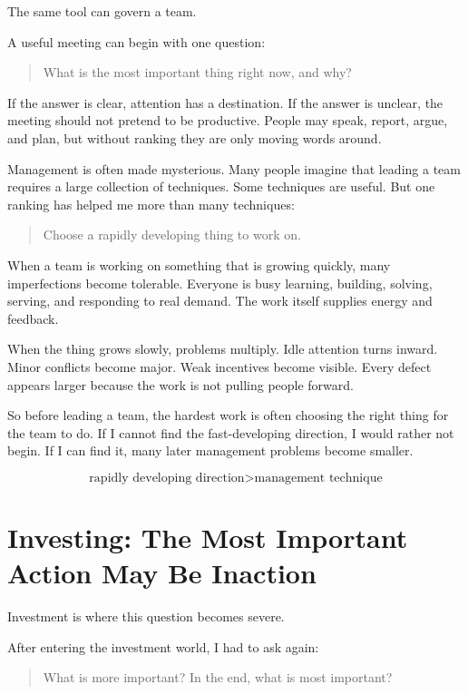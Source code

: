 The same tool can govern a team.

A useful meeting can begin with one question:

\begin{quote}
What is the most important thing right now, and why?
\end{quote}

If the answer is clear, attention has a destination. If the answer is unclear, the meeting should not pretend to be productive. People may speak, report, argue, and plan, but without ranking they are only moving words around.

Management is often made mysterious. Many people imagine that leading a team requires a large collection of techniques. Some techniques are useful. But one ranking has helped me more than many techniques:

\begin{quote}
Choose a rapidly developing thing to work on.
\end{quote}

When a team is working on something that is growing quickly, many imperfections become tolerable. Everyone is busy learning, building, solving, serving, and responding to real demand. The work itself supplies energy and feedback.

When the thing grows slowly, problems multiply. Idle attention turns inward. Minor conflicts become major. Weak incentives become visible. Every defect appears larger because the work is not pulling people forward.

So before leading a team, the hardest work is often choosing the right thing for the team to do. If I cannot find the fast-developing direction, I would rather not begin. If I can find it, many later management problems become smaller.

\[
\text{rapidly developing direction} > \text{management technique}
\]

\section*{Investing: The Most Important Action May Be Inaction}

Investment is where this question becomes severe.

After entering the investment world, I had to ask again:

\begin{quote}
What is more important? In the end, what is most important?
\end{quote}

